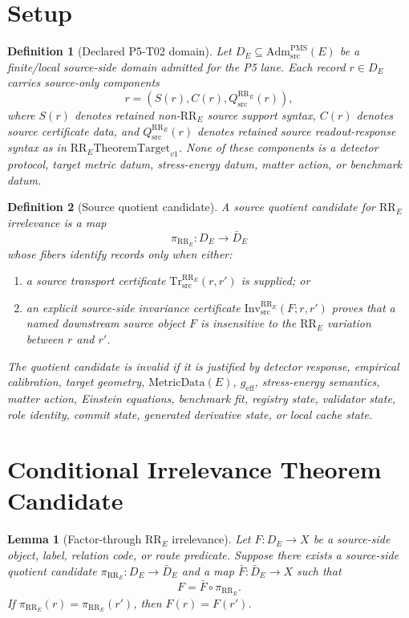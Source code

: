\documentclass[11pt]{article}
\newcommand{\AdmPMS}{\mathrm{Adm}^{\mathrm{PMS}}_{\mathrm{src}}}
\newcommand{\RRE}{\mathrm{RR}_E}
\newcommand{\RRTarget}{\mathrm{RR}_{E}\mathrm{TheoremTarget}_{v1}}
\newcommand{\Qsrc}{Q^{\RRE}_{\mathrm{src}}}
\newcommand{\TrRR}{\mathrm{Tr}^{\RRE}_{\mathrm{src}}}
\newcommand{\InvRR}{\mathrm{Inv}^{\RRE}_{\mathrm{src}}}
\newcommand{\MetricData}{\mathrm{MetricData}}
\newcommand{\geff}{g_{\mathrm{eff}}}
\newtheorem{definition}{Definition}
\newtheorem{lemma}{Lemma}
\begin{document}
\section{Setup}

\begin{definition}[Declared P5-T02 domain]
Let \(D_E\subseteq \AdmPMS(E)\) be a finite/local source-side domain admitted
for the P5 lane. Each record \(r\in D_E\) carries source-only components
\[
  r = (S(r), C(r), \Qsrc(r)),
\]
where \(S(r)\) denotes retained non-\(\RRE\) source support syntax, \(C(r)\)
denotes source certificate data, and \(\Qsrc(r)\) denotes retained source
readout-response syntax as in \(\RRTarget\). None of these components is a
detector protocol, target metric datum, stress-energy datum, matter action, or
benchmark datum.
\end{definition}

\begin{definition}[Source quotient candidate]
A source quotient candidate for \(\RRE\) irrelevance is a map
\[
  \pi_{\RRE}:D_E\to \bar D_E
\]
whose fibers identify records only when either:
\begin{enumerate}[label=Q\arabic*.,leftmargin=*]
  \item a source transport certificate \(\TrRR(r,r')\) is supplied; or
  \item an explicit source-side invariance certificate \(\InvRR(F;r,r')\)
  proves that a named downstream source object \(F\) is insensitive to the
  \(\RRE\) variation between \(r\) and \(r'\).
\end{enumerate}
The quotient candidate is invalid if it is justified by detector response,
empirical calibration, target geometry, \(\MetricData(E)\), \(\geff\),
stress-energy semantics, matter action, Einstein equations, benchmark fit,
registry state, validator state, role identity, commit state, generated
derivative state, or local cache state.
\end{definition}

\section{Conditional Irrelevance Theorem Candidate}

\begin{lemma}[Factor-through \(\RRE\) irrelevance]
Let \(F:D_E\to X\) be a source-side object, label, relation code, or route
predicate. Suppose there exists a source-side quotient candidate
\(\pi_{\RRE}:D_E\to \bar D_E\) and a map \(\bar F:\bar D_E\to X\) such that
\[
  F = \bar F\circ\pi_{\RRE}.
\]
If \(\pi_{\RRE}(r)=\pi_{\RRE}(r')\), then \(F(r)=F(r')\).
\end{lemma}
\end{document}
